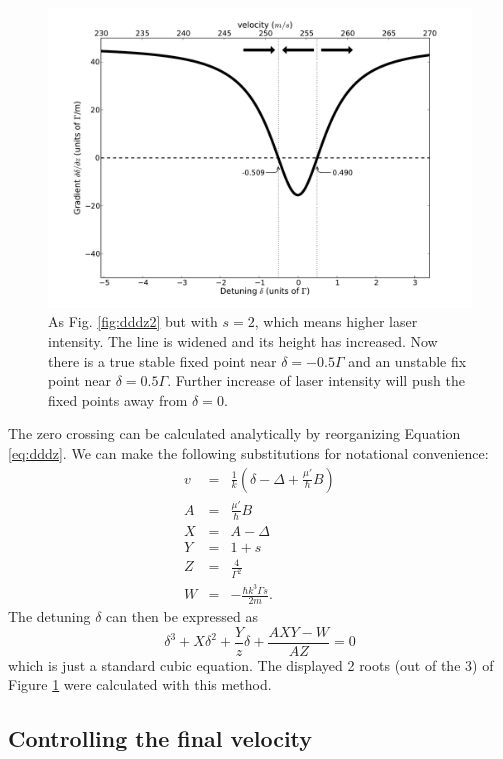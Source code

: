 \documentclass[12pt,a4paper]{article}
\begin{document}
\begin{figure}[htb]
\centering
\includegraphics[width=1.0\textwidth]{detu3}
\caption{As Fig. \ref{fig:dddz2} but with $s = 2$, which means higher laser intensity. The line is widened and its height has increased. Now there is a true stable fixed point near $\delta = -0.5 \Gamma$ and an unstable fix point near $\delta = 0.5 \Gamma$. Further increase of laser intensity will push the fixed points away from $\delta = 0$.}
\label{fig:dddz3}
\end{figure}

The zero crossing can be calculated analytically by reorganizing Equation \ref{eq:dddz}. We can make the following substitutions for notational convenience:
\begin{eqnarray}
v &=& \frac{1}{k}\left(\delta - \Delta + \frac{\mu'}{\hbar}B\right) \\
A &=& \frac{\mu'}{\hbar}B \\
X &=& A - \Delta \\
Y &=& 1+s \\
Z &=& \frac{4}{\Gamma^2} \\
W &=& - \frac{\hbar k^3 \Gamma s}{2 m}.
\end{eqnarray}
The detuning $\delta$ can then be expressed as
\begin{equation}
\delta^3 + X \delta^2 + \frac{Y}{z} \delta + \frac{A X Y - W}{A Z}= 0
\label{eq:deltacubic}
\end{equation}
which is just a standard cubic equation. The displayed 2 roots (out of the 3) of Figure \ref{fig:dddz3} were calculated with this method.

\subsection{Controlling the final velocity}
\end{document}
